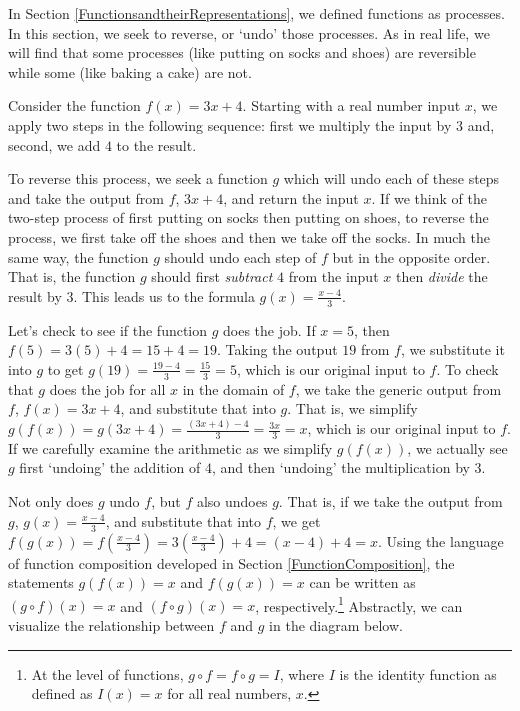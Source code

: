 \documentclass{ximera}
\begin{document}
	\author{Stitz-Zeager}




\setcounter{footnote}{0}

\label{InverseFunctions}

In  Section \ref{FunctionsandtheirRepresentations}, we defined functions as processes.  In this section, we seek to reverse, or `undo' those processes.    As in real life, we will find that some processes (like putting on socks and shoes) are reversible while some (like baking a cake) are not. 

Consider the function $f(x) = 3x+4$.   Starting with a real number input $x$, we  apply two steps in the following sequence:  first we multiply the input by $3$ and, second, we add $4$ to the result.  

To reverse this process, we seek a function $g$ which will undo each of these steps and take the output from $f$, $3x+4$, and return the input $x$.  If we think of the two-step process of first putting on socks then putting on shoes, to reverse the process, we first take off the shoes and then we take off the socks.  In much the same way, the function $g$ should undo each step of $f$ but in the opposite order.  That is, the function $g$ should first \textit{subtract} $4$ from the input $x$ then \textit{divide} the result by $3$. This leads us to the formula $g(x) = \frac{x-4}{3}$.

Let's check to see if the function $g$ does the job.  If $x=5$, then $f(5) = 3(5)+4 = 15+4 = 19$.  Taking the output $19$ from $f$, we substitute it into $g$ to get $g(19) = \frac{19-4}{3} = \frac{15}{3} = 5$, which is our original input to $f$. To check that $g$ does the job for all $x$ in the domain of $f$, we take the generic output from $f$, $f(x) = 3x+4$, and substitute that into $g$.  That is, we simplify  $g(f(x)) = g(3x+4) = \frac{(3x+4)-4}{3} = \frac{3x}{3} = x$, which is our original input to $f$.  If we carefully examine the arithmetic as we simplify $g(f(x))$, we actually see $g$ first `undoing' the addition of $4$, and then `undoing' the multiplication by $3$.  

Not only does $g$ undo $f$, but $f$ also undoes $g$.  That is, if we take the output from $g$, $g(x) = \frac{x-4}{3}$, and substitute that into $f$, we get $f(g(x)) = f\left(\frac{x-4}{3}\right) = 3 \left(\frac{x-4}{3}\right) + 4 = (x-4) + 4 = x$.  Using the language of function composition developed in Section \ref{FunctionComposition}, the statements $g(f(x)) = x$ and $f(g(x)) = x$ can be written as $(g \circ f)(x) = x$ and $(f \circ g)(x) = x$, respectively.\footnote{At the level of functions, $g \circ f = f \circ g = I$, where $I$ is the identity function as defined as $I(x) = x$ for all real numbers, $x$.}  Abstractly, we can visualize the relationship between $f$ and $g$ in the diagram below.  
\end{document}
